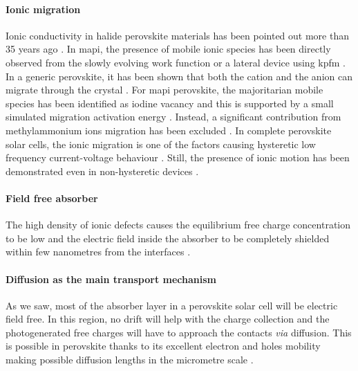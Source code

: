 	\paragraph{Ionic migration}\label{intro_ionic_migration}
	Ionic conductivity in halide perovskite materials has been pointed out more than 35 years ago \cite{Mizusaki1983,Yamada1995,Yamada1998}.
	In \gls{mapi}, the presence of mobile ionic species has been directly observed from the slowly evolving work function or a lateral device using \gls{kpfm} \cite{Birkhold2018,Birkhold2018a}.
	In a generic  perovskite, it has been shown that both the  cation and the  anion can migrate through the crystal \cite{SaifulIslam2000}.
	For \gls{mapi} perovskite, the majoritarian mobile species has been identified as iodine vacancy  \cite{Yang2015e,Senocrate2017} and this is supported by a small simulated migration activation energy \cite{Eames2015,Meloni2016,Haruyama2015,Azpiroz2015,Mosconi2016a}.
	Instead, a significant contribution from methylammonium ions migration has been excluded \cite{Senocrate2018,Senocrate2017,Meloni2016}.
	In complete perovskite solar cells, the ionic migration is one of the factors causing hysteretic low frequency current\hyp{}voltage behaviour \cite{Unger2014,Xiao2015,Meloni2016,Tress2015}.
	Still, the presence of ionic motion has been demonstrated even in non\hyp{}hysteretic devices \cite{Calado2016,Jacobs2018,Bryant2015}.



	\paragraph{Field free absorber}
	The high density of ionic defects causes the equilibrium free charge concentration to be low \cite{Walsh2015} and the electric field inside the absorber to be completely shielded within few nanometres from the interfaces \cite{Tress2015,Richardson2016}.


	\paragraph{Diffusion as the main transport mechanism}
	As we saw, most of the absorber layer in a perovskite solar cell will be electric field free.
	In this region, no drift will help with the charge collection and the photogenerated free charges will have to approach the contacts \textsl{via} diffusion.
	This is possible in perovskite thanks to its excellent electron and holes mobility \cite{Leijtens2014,Herz2017} making possible diffusion lengths in the micrometre scale \cite{Wehrenfennig2014,Wehrenfennig2014a,Stranks2013,Xing2013,Shi2015a,Eperon2014,Liu2017}.

